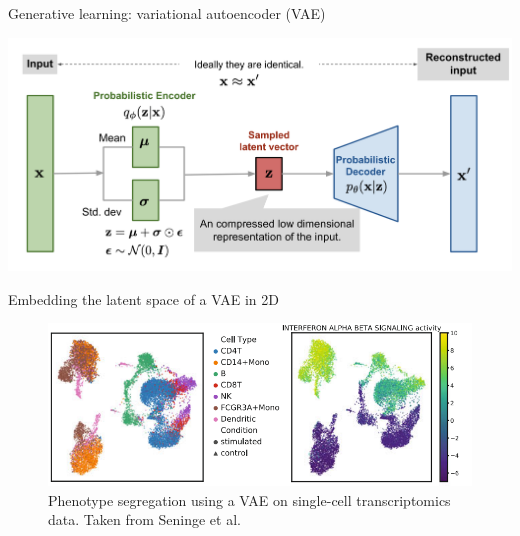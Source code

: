 \documentclass{beamer}					%
\begin{document}
\begin{frame}{Generative learning: variational autoencoder (VAE)}

\begin{center}
\includegraphics[width=1.0\textwidth]{vae}
\end{center}

\end{frame}

\begin{frame}{Embedding the latent space of a VAE in 2D}

\begin{figure}
\begin{center}
\includegraphics[width=1.0\textwidth]{immune}
\end{center}
\caption{Phenotype segregation using a VAE on single-cell transcriptomics data. Taken from Seninge et al.}
\end{figure}

\end{frame}
\end{document}
